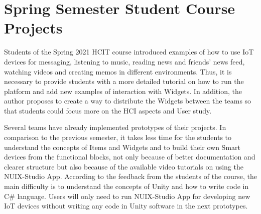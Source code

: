 \section{Spring Semester Student Course Projects}

Students of the Spring 2021 HCIT course introduced examples of how to use IoT devices for messaging, listening to music, reading news and friends' news feed, watching videos and creating memos in different environments. Thus, it is necessary to provide students with a more detailed tutorial on how to run the platform and add new examples of interaction with Widgets. In addition, the author proposes to create a way to distribute the  Widgets between the teams so that students could focus more on the HCI aspects and User study. 

Several teams have already implemented prototypes of their projects. In comparison to the previous semester, it takes less time for the students to understand the concepts of Items and Widgets and to build their own Smart devices from the functional blocks, not only because of better documentation and clearer structure but also because of the available video tutorials on using the NUIX-Studio App. According to the feedback from the students of the course, the main difficulty is to understand the concepts of Unity and how to write code in C\# language. Users will only need to run NUIX-Studio App for developing new IoT devices without writing any code in Unity software in the next prototypes.